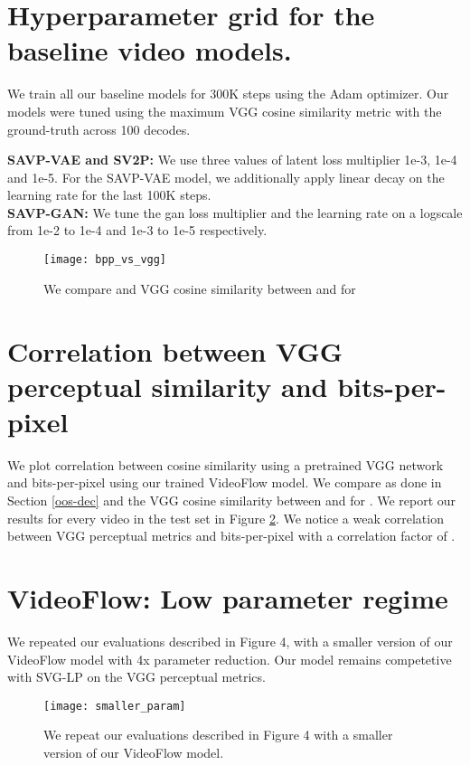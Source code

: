 \documentclass{article} \usepackage{iclr2020_conference,times}
\begin{document}
\section{Hyperparameter grid for the baseline video models.}

We train all our baseline models for 300K steps using the Adam optimizer. Our models were tuned using the maximum VGG cosine similarity metric with the ground-truth across 100 decodes.

\textbf{SAVP-VAE and SV2P:} We use three values of latent loss multiplier 1e-3, 1e-4 and 1e-5. For the SAVP-VAE model, we additionally apply linear decay on the learning rate for the last 100K steps.\\
\textbf{SAVP-GAN:} We tune the gan loss multiplier and the learning rate on a logscale from 1e-2 to 1e-4 and 1e-3 to 1e-5 respectively.

\begin{figure}[h]
\centering
\texttt{[image: bpp\_vs\_vgg]}
\caption{We compare  and VGG cosine similarity between  and  for }
\label{fig:bpp_vs_vgg}
\end{figure}

\section{Correlation between VGG perceptual similarity and bits-per-pixel}
We plot correlation between cosine similarity using a pretrained VGG network and bits-per-pixel using our trained VideoFlow model. We compare  as done in Section \ref{oos-dec} and the VGG cosine similarity between  and  for . We report our results for every video in the test set in Figure  \ref{fig:bpp_vs_vgg}. We notice a weak correlation between VGG perceptual metrics and bits-per-pixel with a correlation factor of . 

\section{VideoFlow: Low parameter regime}

We repeated our evaluations described in Figure 4, with a smaller version of our VideoFlow model with 4x parameter reduction. Our model remains competetive with SVG-LP on the VGG perceptual metrics.


\begin{figure}[h]
\centering
\texttt{[image: smaller\_param]}
\caption{We repeat our evaluations described in Figure 4 with a smaller version of our VideoFlow model.}
\label{fig:bpp_vs_vgg}
\end{figure} 
\end{document}
